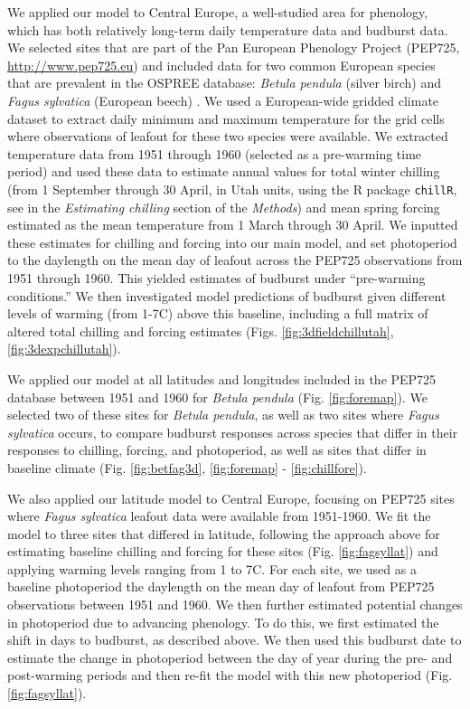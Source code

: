 \documentclass{article}
\begin{document}
\par We applied our model to Central Europe, a well-studied area for phenology, which has both relatively long-term daily temperature data and budburst data. We selected sites that are part of the Pan European Phenology Project (PEP725, \url{http://www.pep725.eu}) and included data for two common European species that are prevalent in the OSPREE database: \emph{Betula pendula} (silver birch) and \emph{Fagus sylvatica} (European beech) \emph{\citep{Templ2018}}. We used a European-wide gridded climate dataset \emph{\citep[{\normalfont E-OBS},][]{cornes2018}} to extract daily minimum and maximum temperature for the grid cells where observations of leafout for these two species were available. We extracted temperature data from 1951 through 1960 (selected as a pre-warming time period) and used these data to estimate annual values for total winter chilling (from 1 September through 30 April, in Utah units, using the R package \texttt{chillR}, see in the \emph{Estimating chilling} section of the \emph{Methods}) and mean spring forcing estimated as the mean temperature from 1 March through 30 April. We inputted these estimates for chilling and forcing into our main model, and set photoperiod to the daylength on the mean day of leafout across the PEP725 observations from 1951 through 1960. This yielded estimates of budburst under ``pre-warming conditions.'' We then investigated model predictions of budburst given different levels of warming (from 1-7\degree C) above this baseline, including a full matrix of altered total chilling and forcing estimates (Figs. \ref{fig:3dfieldchillutah}, \ref{fig:3dexpchillutah}). 
\par We applied our model at all latitudes and longitudes included in the PEP725 database between 1951 and 1960 for \emph{Betula pendula} (Fig. \ref{fig:foremap}). We selected two of these sites for \emph{Betula pendula}, as well as two sites where \emph{Fagus sylvatica} occurs, to compare budburst responses across species that differ in their responses to chilling, forcing, and photoperiod, as well as sites that differ in baseline climate (Fig. \ref{fig:betfag3d}, \ref{fig:foremap} - \ref{fig:chillfore}).

\par We also applied our latitude model to Central Europe, focusing on PEP725 sites where \emph{Fagus sylvatica} leafout data were available from 1951-1960. We fit the model to three sites that differed in latitude, following the approach above for estimating baseline chilling and forcing for these sites (Fig. \ref{fig:fagsyllat}) and applying warming levels ranging from 1 to 7\degree C.   For each site, we used as a baseline photoperiod the daylength on the mean day of leafout from PEP725 observations between 1951 and 1960. We then further estimated potential changes in photoperiod due to advancing phenology. To do this, we first estimated the shift in days to budburst, as described above.
We then used this budburst date to estimate the change in photoperiod between the day of year during the pre- and post-warming periods and then re-fit the model with this new photoperiod (Fig. \ref{fig:fagsyllat}). 
\end{document}
